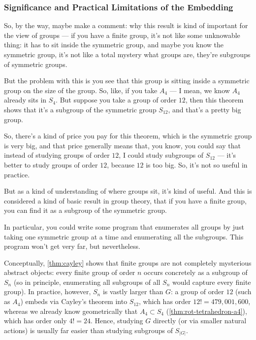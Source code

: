 \subsubsection{Significance and Practical Limitations of the Embedding}

\begin{speech}[01:17:43 - 01:19:29]
So, by the way, maybe make a comment: why this result is kind of important for the view of groups --- if you have a finite group, it's not like some unknowable thing: it has to sit inside the symmetric group, and maybe you know the symmetric group, it's not like a total mystery what groups are, they're subgroups of symmetric groups.

But the problem with this is you see that this group  is sitting inside a symmetric group on the size of the group. So, like, if you take $A_4$ --- I mean, we know $A_4$ already sits in $S_4$. But suppose you take a group of order $12$, then this theorem shows that it's a subgroup of the symmetric group $S_{12}$, and that's a pretty big group.

So, there's a kind of price you pay for this theorem, which is the symmetric group is very big, and that price generally means that, you know, you could say that instead of studying groups of order $12$, I could study subgroups of $S_{12}$ --- it's better to study groups of order $12$, because $12$ is too big.  So, it's not so useful in practice.

But as a kind of understanding of where groups sit, it's kind of useful. And this is considered a kind of basic result in group theory, that if you have a finite group, you can find it as a subgroup of the symmetric group.

In particular, you could write some program that enumerates all groups by just taking one symmetric group at a time and enumerating all the subgroups. This program won't get very far, but nevertheless.
\end{speech}

\begin{insight}
Conceptually, \cref{thm:cayley} shows that finite groups are not completely mysterious abstract objects: every finite group of order $n$ occurs concretely as a subgroup of $S_n$ (so in principle, enumerating all subgroups of all $S_n$ would capture every finite group). In practice, however, $S_n$ is vastly larger than $G$: a group of order $12$ (such as $A_4$) embeds via Cayley's theorem into $S_{12}$, which has order $12! = 479{,}001{,}600$, whereas we already know geometrically that $A_4 \subset S_4$ (\cref{thm:rot-tetrahedron-a4}), which has order only $4! = 24$. Hence, studying $G$ directly (or via smaller natural actions) is usually far easier than studying subgroups of $S_{|G|}$.
\end{insight}

